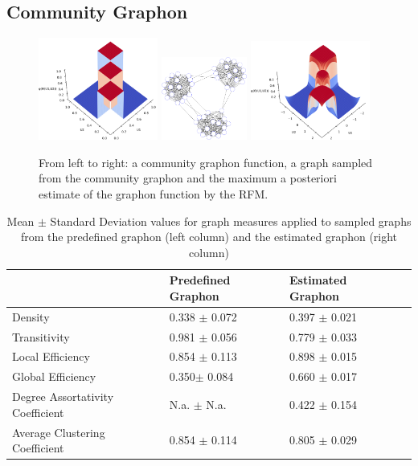 \documentclass[11pt]{report} %
\begin{document}
\subsection{Community Graphon}
\begin{figure}[H]
    \center
    \includegraphics[width= 0.35\textwidth]{communitygraphon}%
    \hfill
    \includegraphics[width= 0.25\textwidth]{communitygraph}%
    \hfill
    \includegraphics[width= 0.35\textwidth]{estimatedcommunitygraphon}%
    \caption{From left to right: a community graphon function, a graph sampled from the community graphon and the maximum a posteriori estimate of the graphon function by the RFM.}
    \label{estimatedcommunitygraphon}
\end{figure}
\begin{table}[h]
\caption{Mean $\pm$ Standard Deviation values for graph measures applied to sampled graphs from the predefined graphon (left column) and the estimated graphon (right column)}
\begin{tabular}{|l|l|l|l|}
\hline
 & \textbf{Predefined Graphon} & \textbf{Estimated Graphon}  \\ \hline
 Density & 0.338 $\pm$ 0.072                        & 0.397 $\pm$ 0.021 \\ \hline
 Transitivity & 0.981 $\pm$ 0.056                   & 0.779 $\pm$ 0.033 \\ \hline
Local Efficiency & 0.854 $\pm$ 0.113                & 0.898 $\pm$ 0.015 \\ \hline
Global Efficiency & 0.350$\pm$ 0.084 & 0.660 $\pm$ 0.017 \\ \hline
Degree Assortativity Coefficient & N.a. $\pm$ N.a. &  0.422 $\pm$ 0.154 \\ \hline
Average Clustering Coefficient & 0.854 $\pm$ 0.114 &  0.805 $\pm$ 0.029 \\ \hline
\end{tabular}
\end{table}
\end{document}
